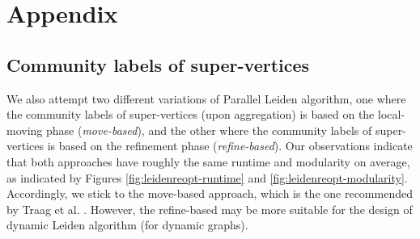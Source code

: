 \section{Appendix}

\subsection{Community labels of super-vertices}

We also attempt two different variations of Parallel Leiden algorithm, one where the community labels of super-vertices (upon aggregation) is based on the local-moving phase (\textit{move-based}), and the other where the community labels of super-vertices is based on the refinement phase (\textit{refine-based}). Our observations indicate that both approaches have roughly the same runtime and modularity on average, as indicated by Figures \ref{fig:leidenreopt-runtime} and \ref{fig:leidenreopt-modularity}. Accordingly, we stick to the move-based approach, which is the one recommended by Traag et al. \cite{com-traag19}. However, the refine-based may be more suitable for the design of dynamic Leiden algorithm (for dynamic graphs).



